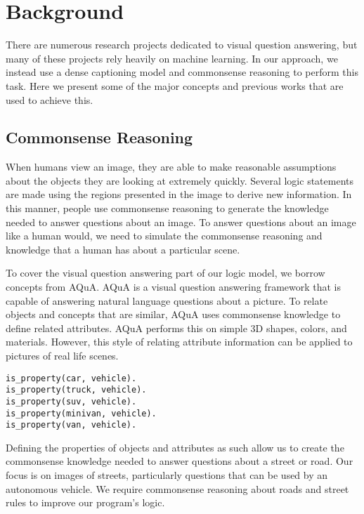 \section{Background}
There are numerous research projects dedicated to visual question answering, but many of these projects rely heavily on machine learning. In our approach, we instead use a dense captioning model and commonsense reasoning to perform this task. Here we present some of the major concepts and previous works that are used to achieve this.

\subsection{Commonsense Reasoning}
When humans view an image, they are able to make reasonable assumptions about the objects they are looking at extremely quickly. Several logic statements are made using the regions presented in the image to derive new information. In this manner, people use commonsense reasoning to generate the knowledge needed to answer questions about an image. To answer questions about an image like a human would, we need to simulate the commonsense reasoning and knowledge that a human has about a particular scene. 

To cover the visual question answering part of our logic model, we borrow concepts from AQuA\cite{inproceedings}. AQuA is a visual question answering framework that is capable of answering natural language questions about a picture. To relate objects and concepts that are similar, AQuA uses commonsense knowledge to define related attributes. AQuA performs this on simple 3D shapes, colors, and materials. However, this style of relating attribute information can be applied to pictures of real life scenes. 
\begin{verbatim}
is_property(car, vehicle).
is_property(truck, vehicle).
is_property(suv, vehicle).
is_property(minivan, vehicle).
is_property(van, vehicle).
\end{verbatim}
Defining the properties of objects and attributes as such allow us to create the commonsense knowledge needed to answer questions about a street or road. Our focus is on images of streets, particularly questions that can be used by an autonomous vehicle. We require commonsense reasoning about roads and street rules to improve our program's logic.

